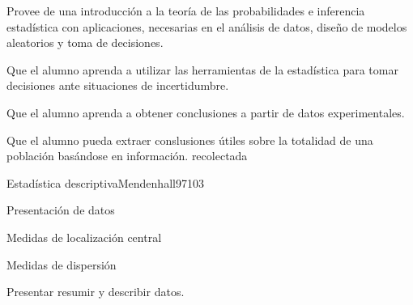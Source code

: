 
\begin{syllabus}


\begin{justification}
Provee de una introducción a la teoría de las probabilidades e inferencia estadística con aplicaciones, necesarias en el análisis de datos, diseño de modelos aleatorios y toma de decisiones.
\end{justification}

\begin{goals}
\item Que el alumno aprenda a utilizar las herramientas de la estadística para tomar decisiones ante situaciones de incertidumbre.
\item Que el alumno aprenda a obtener conclusiones a partir de datos experimentales.
\item Que el alumno pueda extraer conslusiones útiles sobre la totalidad de una población basándose en información. recolectada
\end{goals}



\begin{unit}{Estadística descriptiva}{}{Mendenhall97}{10}{3}
\begin{topics}
      \item Presentación de datos
      \item Medidas de localización central
      \item Medidas de dispersión
   \end{topics}

   \begin{learningoutcomes}
      \item Presentar resumir y describir datos.
   \end{learningoutcomes}
\end{unit}


\end{syllabus}
